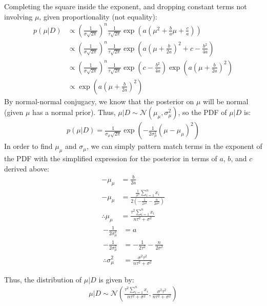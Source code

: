 \documentclass[submit]{harvardml}
\begin{document}
Completing the square inside the exponent, and dropping constant terms not involving $\mu$, given proportionality (not equality):
\begin{align*}
    p(\mu|D) &\propto \left(\frac{1}{\sigma\sqrt{2\pi}}\right)^n \frac{1}{\tau\sqrt{2\pi}} \exp\left(a\left(\mu^2 + \frac{b}{a}\mu + \frac{c}{a}\right)\right)\\
    &\propto \left(\frac{1}{\sigma\sqrt{2\pi}}\right)^n \frac{1}{\tau\sqrt{2\pi}} \exp\left(a\left(\mu + \frac{b}{2a}\right)^2 + c - \frac{b^2}{4a}\right)\\
    &\propto \left(\frac{1}{\sigma\sqrt{2\pi}}\right)^n \frac{1}{\tau\sqrt{2\pi}} \exp\left(c - \frac{b^2}{4a}\right) \exp\left(a\left(\mu + \frac{b}{2a}\right)^2\right)\\
    &\propto \exp\left(a\left(\mu + \frac{b}{2a}\right)^2\right)
\end{align*}
By normal-normal conjugacy, we know that the posterior on $\mu$ will be normal (given $\mu$ has a normal prior). Thus, $\mu|D \sim \mathcal{N}(\mu_{\mu}, \sigma_{\mu}^2)$, so the PDF of $\mu|D$ is:
\begin{align*}
    p(\mu|D) = \frac{1}{\sigma_{\mu}\sqrt{2\pi}} \exp\left( -\frac{1}{2 \sigma_{\mu}^2}\left(\mu-\mu_{\mu}\right)^{2}\right)
\end{align*}
In order to find $\mu_\mu$ and $\sigma_\mu$, we can simply pattern match terms in the exponent of the PDF with the simplified expression for the posterior in terms of $a$, $b$, and $c$ derived above:
\begin{align*}
    -\mu_\mu &= \frac{b}{2a}\\
    -\mu_\mu &= \frac{\frac{1}{\sigma^2} \sum_{i=1}^{n} x_i}{2\left(-\frac{1}{2 \tau^2} - \frac{n}{2 \sigma^2}\right)}\\
    \therefore \mu_\mu &= \frac{\tau^2 \sum_{i=1}^n x_i}{n\tau^2 + \sigma^2}
\end{align*}
\begin{align*}
    -\frac{1}{2 \sigma_{\mu}^2} &= a\\
    -\frac{1}{2 \sigma_{\mu}^2} &= -\frac{1}{2 \tau^2} - \frac{n}{2 \sigma^2}\\
    \therefore \sigma_{\mu}^2 &= \frac{\sigma^2 \tau^2}{n \tau^2 + \sigma^2}
\end{align*}

Thus, the distribution of $\mu | D$ is given by:
\begin{align*}
    \mu|D \sim \mathcal{N}\left(\frac{\tau^2 \sum_{i=1}^n x_i}{n\tau^2 + \sigma^2}, \frac{\sigma^2 \tau^2}{n \tau^2 + \sigma^2}\right)
\end{align*}
\end{document}
